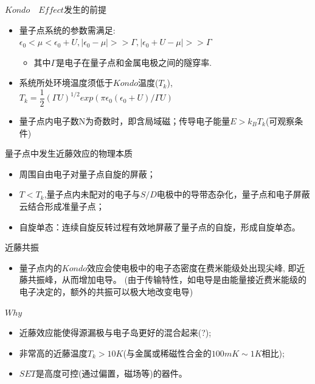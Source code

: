 \documentclass{beamer}[fontset=windows]
\begin{document}
    \begin{frame}
    \begin{block}{$Kondo\quad Effect$发生的前提}
    \begin{itemize}
    \item 量子点系统的参数需满足:\\$\epsilon_{0}<\mu<\epsilon_{0}+U,|\epsilon_{0}-\mu|>>\Gamma,|\epsilon_{0}+U-\mu|>>\Gamma$
    \begin{itemize}
    \item 其中$\Gamma$是电子在量子点和金属电极之间的隧穿率.
    \end{itemize}
    \item 系统所处环境温度须低于$Kondo$温度($T_{k}$),\\$T_{k}=\dfrac{1}{2}(\Gamma U)^{1/2}exp(\pi\epsilon_{0}(\epsilon_{0}+U)/\Gamma U)$
    \item 量子点内电子数N为奇数时，即含局域磁；传导电子能量$E>k_{B}T_{k}$(可观察条件)
    \end{itemize}
    \end{block}
    \end{frame}
    \begin{frame}
    \begin{block}{量子点中发生近藤效应的物理本质}
    \begin{itemize}
    \item 周围自由电子对量子点自旋的屏蔽；
    \item $T<T_{k}$,量子点内未配对的电子与$S/D$电极中的导带态杂化，量子点和电子屏蔽云结合形成准量子点；
    \item 自旋单态：连续自旋反转过程有效地屏蔽了量子点的自旋，形成自旋单态。
    \end{itemize}
    \end{block}
    \begin{block}{近藤共振}
    \begin{itemize}
    \item 量子点内的$Kondo$效应会使电极中的电子态密度在费米能级处出现尖峰, 即近藤共振峰，从而增加电导。
(由于传输特性，如电导是由能量接近费米能级的电子决定的，额外的共振可以极大地改变电导)
    \end{itemize}
    \end{block}
    \end{frame}
    \begin{frame}
    \begin{block}{$Why$}
    \begin{itemize}
    \item 近藤效应能使得源漏极与电子岛更好的混合起来(?);
    \item 非常高的近藤温度$T_{k}> 10 K$(与金属或稀磁性合金的$100 mK\sim1 K$相比);
    \item $SET$是高度可控(通过偏置，磁场等)的器件。
    \end{itemize}
    \end{block}
    \end{frame}
\end{document}
